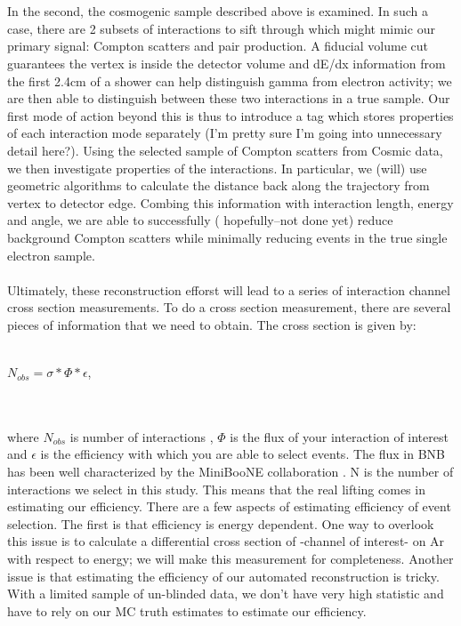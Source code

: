 \documentclass[12pt]{article}
\begin{document}
\\ \\  In the second, the cosmogenic sample described above is examined.  In such a case, there are 2 subsets of interactions to sift through which might mimic our primary signal: Compton scatters and pair production.  A fiducial volume cut guarantees the vertex is inside the detector volume and dE/dx information from the first 2.4cm of a shower can help distinguish gamma from electron activity; we are then able to distinguish between these two interactions in a true sample.  Our first mode of action beyond this is thus to introduce a tag which stores properties of each interaction mode separately (I'm pretty sure I'm going into unnecessary detail here?). Using the selected sample of Compton scatters from Cosmic data, we then investigate properties of the interactions.  In particular, we (will) use geometric algorithms to calculate the distance back along the trajectory from vertex to detector edge.  Combing this information with interaction length, energy and angle, we are able to successfully ( hopefully--not done yet) reduce background Compton scatters while minimally reducing events in the true single electron sample. 
\\ \\Ultimately, these reconstruction efforst will lead to a series of interaction channel cross section measurements.  To do a cross section measurement, there are several pieces of information that we need to obtain. The cross section is given by:
\\ \\ \centerline{ $N_{obs} = \sigma * \Phi * \epsilon$, }	
\\ \\ where $N_{obs}$ is number of interactions , $\Phi$ is the flux of your interaction of interest and $\epsilon$ is the efficiency with which you are able to select events.  
The flux in BNB has been well characterized by the MiniBooNE collaboration \cite{miniboone}. N is the number of interactions we select in this study.  This means that the real lifting comes in estimating our efficiency. There are a few aspects of estimating efficiency of event selection.  The first is that efficiency is energy dependent.  One way to overlook this issue is to calculate a differential cross section of -channel of interest- on Ar with respect to energy; we will make this measurement for completeness.  Another issue is that estimating the efficiency of our automated reconstruction is tricky.  With a limited sample of un-blinded data, we don't have very high statistic and have to rely on our MC truth estimates to estimate our efficiency.     
\end{document}
